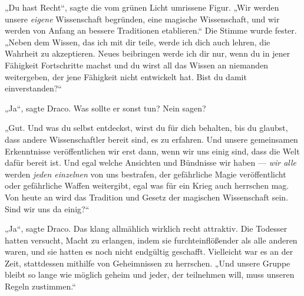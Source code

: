 „Du hast Recht“, sagte die vom grünen Licht umrissene Figur.
„Wir werden unsere \emph{eigene} Wissenschaft begründen, eine magische Wissenschaft, und wir werden von Anfang an bessere Traditionen etablieren.“ Die Stimme wurde fester.
„Neben dem Wissen, das ich mit dir teile, werde ich dich auch lehren, die Wahrheit zu akzeptieren. Neues beibringen werde ich dir nur, wenn du in jener Fähigkeit Fortschritte machst und du wirst all das Wissen an niemanden weitergeben, der jene Fähigkeit nicht entwickelt hat. Bist du damit einverstanden?“

„Ja“, sagte Draco. Was sollte er sonst tun? Nein sagen?

„Gut. Und was du selbst entdeckst, wirst du für dich behalten, bis du glaubst, dass andere Wissenschaftler bereit sind, es zu erfahren. Und unsere gemeinsamen Erkenntnisse veröffentlichen wir erst dann, wenn wir uns einig sind, dass die Welt dafür bereit ist. Und egal welche Ansichten und Bündnisse wir haben — \emph{wir alle} werden \emph{jeden einzelnen} von uns bestrafen, der gefährliche Magie veröffentlicht oder gefährliche Waffen weitergibt, egal was für ein Krieg auch herrschen mag. Von heute an wird das Tradition und Gesetz der magischen Wissenschaft sein. Sind wir uns da einig?“

„Ja“, sagte Draco. Das klang allmählich wirklich recht attraktiv. Die Todesser hatten versucht, Macht zu erlangen, indem sie furchteinflößender als alle anderen waren, und sie hatten es noch nicht endgültig geschafft. Vielleicht war es an der Zeit, stattdessen mithilfe von Geheimnissen zu herrschen.
„Und unsere Gruppe bleibt so lange wie möglich geheim und jeder, der teilnehmen will, muss unseren Regeln zustimmen.“

